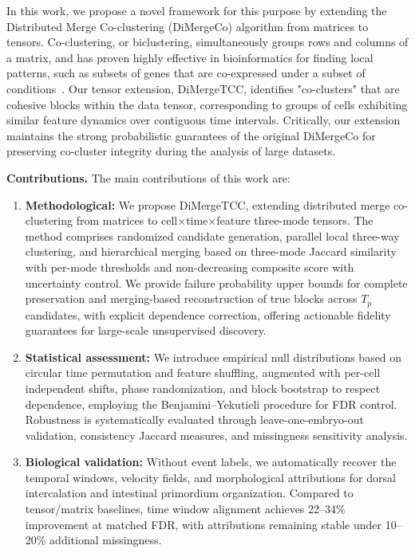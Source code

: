 \documentclass[unnumsec,webpdf,modern,large,namedate]{oup-authoring-template}%
\theoremstyle{thmstyleone}\newtheorem{theorem}{Theorem}
\theoremstyle{thmstyletwo}\newtheorem{example}{Example}
\theoremstyle{thmstylethree}\newtheorem{definition}{Definition}
\begin{document}
In this work, we propose a novel framework for this purpose by extending the Distributed Merge Co-clustering (DiMergeCo) algorithm from matrices to tensors. Co-clustering, or biclustering, simultaneously groups rows and columns of a matrix, and has proven highly effective in bioinformatics for finding local patterns, such as subsets of genes that are co-expressed under a subset of conditions~\citep{zapala2006MultivariateRegressionAnalysis}. Our tensor extension, DiMergeTCC, identifies "co-clusters" that are cohesive blocks within the data tensor, corresponding to groups of cells exhibiting similar feature dynamics over contiguous time intervals. Critically, our extension maintains the strong probabilistic guarantees of the original DiMergeCo for preserving co-cluster integrity during the analysis of large datasets.

\textbf{Contributions.} The main contributions of this work are:
\begin{enumerate}
\item \textbf{Methodological:} We propose DiMergeTCC, extending distributed merge co-clustering from matrices to cell$\times$time$\times$feature three-mode tensors. The method comprises randomized candidate generation, parallel local three-way clustering, and hierarchical merging based on three-mode Jaccard similarity with per-mode thresholds and non-decreasing composite score with uncertainty control. We provide failure probability upper bounds for complete preservation and merging-based reconstruction of true blocks across $T_p$ candidates, with explicit dependence correction, offering actionable fidelity guarantees for large-scale unsupervised discovery.
\item \textbf{Statistical assessment:} We introduce empirical null distributions based on circular time permutation and feature shuffling, augmented with per-cell independent shifts, phase randomization, and block bootstrap to respect dependence, employing the Benjamini--Yekutieli procedure for FDR control. Robustness is systematically evaluated through leave-one-embryo-out validation, consistency Jaccard measures, and missingness sensitivity analysis.
\item \textbf{Biological validation:} Without event labels, we automatically recover the temporal windows, velocity fields, and morphological attributions for dorsal intercalation and intestinal primordium organization. Compared to tensor/matrix baselines, time window alignment achieves 22--34\% improvement at matched FDR, with attributions remaining stable under 10--20\% additional missingness.
\end{enumerate}
\end{document}
